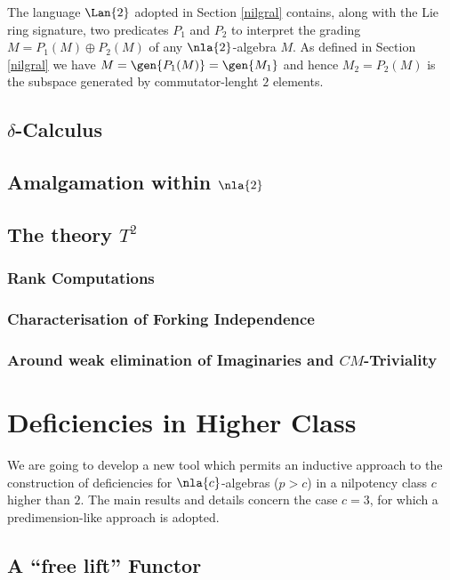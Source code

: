 \documentclass[a4paper,twoside,10pt,ngerman,english]{report}
\begin{document}
\smallskip
The language $\Lan{2}$ adopted in Section \ref{nilgral} contains,
along with the Lie ring signature, two predicates $P_{1}$ and $P_{2}$ to interpret the grading $M=P_{1}(M)\oplus P_{2}(M)$
of any $\nla{2}$-algebra $M$.
As defined in Section \ref{nilgral} we have $M=\gen{P_{1}(M)}=\gen{M_{1}}$ and hence $M_{2}=P_{2}(M)$ is the subspace
generated by commutator-lenght $2$ elements.
\section{$\delta$-Calculus}\label{sec:deltadue}

\section{Amalgamation within $\nla{2}$}\label{amalga2}

\section{The theory $T^{2}$}\label{t2axioms}

\subsection{Rank Computations}\label{rango}

\subsection{Characterisation of Forking Independence}\label{forking}

\subsection{Around weak elimination of Imaginaries and $CM$-Triviality%
}\label{cmt}
\newpage
\thispagestyle{empty}
\cleardoublepage
\chapter{Deficiencies in Higher Class}\label{tre}
We are going to develop a new tool which permits an inductive approach to the construction
of deficiencies for $\nla{c}$-algebras ($p>c$) in a nilpotency class $c$ higher than $2$.
The main results and details concern the case $c=3$, for which a predimension-like approach is adopted.
\section{A ``free lift'' Functor}%
\label{freelift}

\end{document}
